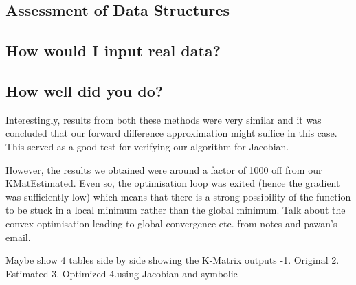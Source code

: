 \documentclass[titlepage]{article}
\begin{document}
\subsection{Assessment of Data Structures}
\subsection{How would I input real data?}
\subsection{How well did you do?}
Interestingly, results from both these methods were very similar and it was concluded that our forward difference approximation might suffice in this case. This served as a good test for verifying our algorithm for Jacobian.


However, the results we obtained were around a factor of 1000 off from our KMatEstimated. Even so, the optimisation loop was exited (hence the gradient was sufficiently low) which means that there is a strong possibility of the function to be stuck in a local minimum rather than the global minimum. Talk about the convex optimisation leading to global convergence etc. from notes and pawan’s email.


Maybe show 4 tables side by side showing the K-Matrix outputs -1. Original 2. Estimated 3. Optimized 4.using Jacobian and symbolic
\end{document}
